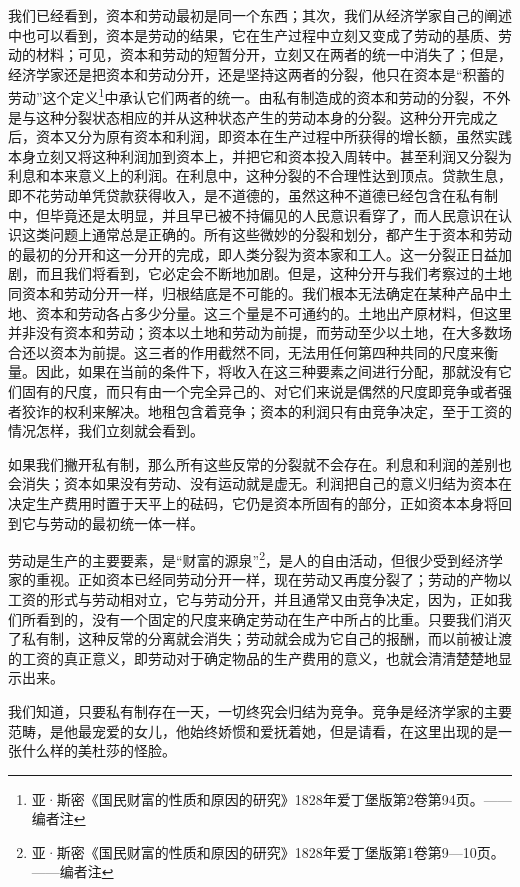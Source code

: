 \documentclass[a4paper,twoside,12pt,AutoFakeBold]{ctexart}
\begin{document}
我们已经看到，资本和劳动最初是同一个东西；其次，我们从经济学家自己的阐述中也可以看到，资本是劳动的结果，它在生产过程中立刻又变成了劳动的基质、劳动的材料；可见，资本和劳动的短暂分开，立刻又在两者的统一中消失了；但是，经济学家还是把资本和劳动分开，还是坚持这两者的分裂，他只在资本是“积蓄的劳动”这个定义\footnote{亚·斯密《国民财富的性质和原因的研究》1828年爱丁堡版第2卷第94页。——编者注}中承认它们两者的统一。由私有制造成的资本和劳动的分裂，不外是与这种分裂状态相应的并从这种状态产生的劳动本身的分裂。这种分开完成之后，资本又分为原有资本和利润，即资本在生产过程中所获得的增长额，虽然实践本身立刻又将这种利润加到资本上，并把它和资本投入周转中。甚至利润又分裂为利息和本来意义上的利润。在利息中，这种分裂的不合理性达到顶点。贷款生息，即不花劳动单凭贷款获得收入，是不道德的，虽然这种不道德已经包含在私有制中，但毕竟还是太明显，并且早已被不持偏见的人民意识看穿了，而人民意识在认识这类问题上通常总是正确的。所有这些微妙的分裂和划分，都产生于资本和劳动的最初的分开和这一分开的完成，即人类分裂为资本家和工人。这一分裂正日益加剧，而且我们将看到，它必定会不断地加剧。但是，这种分开与我们考察过的土地同资本和劳动分开一样，归根结底是不可能的。我们根本无法确定在某种产品中土地、资本和劳动各占多少分量。这三个量是不可通约的。土地出产原材料，但这里并非没有资本和劳动；资本以土地和劳动为前提，而劳动至少以土地，在大多数场合还以资本为前提。这三者的作用截然不同，无法用任何第四种共同的尺度来衡量。因此，如果在当前的条件下，将收入在这三种要素之间进行分配，那就没有它们固有的尺度，而只有由一个完全异己的、对它们来说是偶然的尺度即竞争或者强者狡诈的权利来解决。地租包含着竞争；资本的利润只有由竞争决定，至于工资的情况怎样，我们立刻就会看到。

如果我们撇开私有制，那么所有这些反常的分裂就不会存在。利息和利润的差别也会消失；资本如果没有劳动、没有运动就是虚无。利润把自己的意义归结为资本在决定生产费用时置于天平上的砝码，它仍是资本所固有的部分，正如资本本身将回到它与劳动的最初统一体一样。

劳动是生产的主要要素，是“财富的源泉”\footnote{亚·斯密《国民财富的性质和原因的研究》1828年爱丁堡版第1卷第9—10页。——编者注}，是人的自由活动，但很少受到经济学家的重视。正如资本已经同劳动分开一样，现在劳动又再度分裂了；劳动的产物以工资的形式与劳动相对立，它与劳动分开，并且通常又由竞争决定，因为，正如我们所看到的，没有一个固定的尺度来确定劳动在生产中所占的比重。只要我们消灭了私有制，这种反常的分离就会消失；劳动就会成为它自己的报酬，而以前被让渡的工资的真正意义，即劳动对于确定物品的生产费用的意义，也就会清清楚楚地显示出来。

我们知道，只要私有制存在一天，一切终究会归结为竞争。竞争是经济学家的主要范畴，是他最宠爱的女儿，他始终娇惯和爱抚着她，但是请看，在这里出现的是一张什么样的美杜莎的怪脸。
\end{document}
